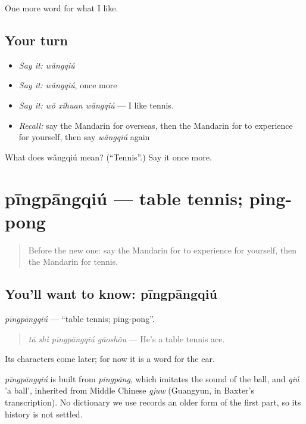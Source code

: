 \begin{grammarlens}[title={What you've built}]
One more word for what I like.
\end{grammarlens}

\subsection*{Your turn}
\begin{itemize}
\raggedright
  \item \emph{Say it:} \emph{wǎngqiú}
  \item \emph{Say it:} \emph{wǎngqiú}, once more
  \item \emph{Say it:} \emph{wǒ xǐhuan wǎngqiú} — I like tennis.
  \item \emph{Recall:} say the Mandarin for overseas, then the Mandarin for to experience for yourself, then say \emph{wǎngqiú} again
\end{itemize}

\begin{tcolorbox}[breakable,colback=teal!4,colframe=teal!35!black,title={Before you move on}]
What does wǎngqiú mean? (\textquotedblleft{}Tennis\textquotedblright{}.) Say it once more.
\end{tcolorbox}
\section[pīngpāngqiú]{pīngpāngqiú — table tennis; ping-pong}

\label{lesson:ZH-C262-pingpangqiu}



\begin{quote}
Before the new one: say the Mandarin for to experience for yourself, then the Mandarin for tennis.
\end{quote}

\subsection*{You'll want to know: pīngpāngqiú}
\emph{pīngpāngqiú} — \textquotedblleft{}table tennis; ping-pong\textquotedblright{}.

\begin{quote}
\emph{tā shì pīngpāngqiú gāoshǒu} — He's a table tennis ace.
\end{quote}

Its characters come later; for now it is a word for the ear.

\begin{cousinweb}
\emph{pīngpāngqiú} is built from \emph{pīngpāng}, which imitates the sound of the ball, and \emph{qiú} 'a ball', inherited from Middle Chinese \emph{gjuw} (Guangyun, in Baxter's transcription). No dictionary we use records an older form of the first part, so its history is not settled.
\end{cousinweb}

